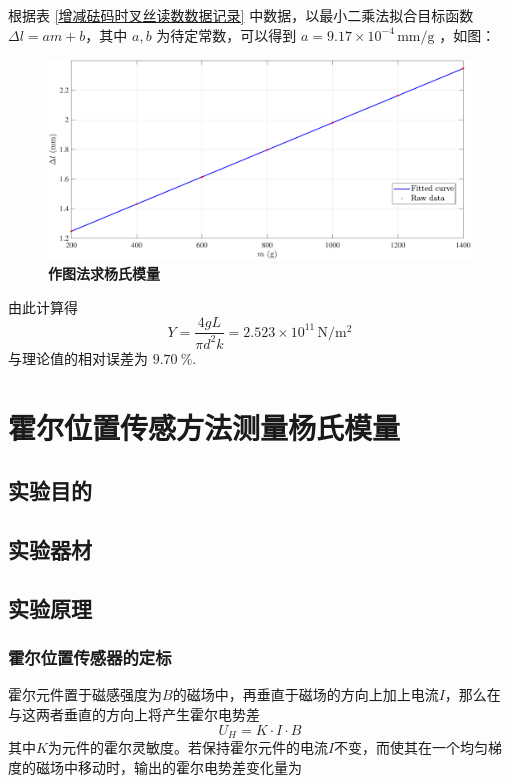 \documentclass[zihao=5, UTF8]{article}
\theoremstyle{MyLineTheoremStyle} %
\theoremstyle{MyBlockTheoremStyle} %
\theoremstyle{MySubsubsectionStyle} %
\begin{document}
根据表 \ref{增减砝码时叉丝读数数据记录} 中数据，以最小二乘法拟合目标函数 $\Delta l = am+b $，其中 $a,b$ 为待定常数，可以得到 $a= 9.17\times10^{-4}\,\mathrm{mm/g}$ ，如图：

\begin{figure}[H]
    \centering
    \includegraphics[width=\textwidth]{assets/2024-08-23_19-54-13.pdf}
    \caption{\textbf{作图法求杨氏模量}}\label{作图法求杨氏模量}
\end{figure}

由此计算得
	\begin{equation}
        Y=\frac{4gL}{\pi d^2k}=2.523\times10^{11}\,\mathrm{N/m^2}
    \end{equation}
与理论值的相对误差为 $9.70\ \%$.

\newpage
\section{霍尔位置传感方法测量杨氏模量}

\subsection{实验目的}
\subsection{实验器材}
\subsection{实验原理}
\subsubsection{霍尔位置传感器的定标}

霍尔元件置于磁感强度为$ B $的磁场中，再垂直于磁场的方向上加上电流$ I $，那么在与这两者垂直的方向上将产生霍尔电势差
\begin{equation}
    U_H=K\cdot I\cdot B
\end{equation}
其中$ K $为元件的霍尔灵敏度。若保持霍尔元件的电流$ I $不变，而使其在一个均匀梯度的磁场中移动时，输出的霍尔电势差变化量为
\end{document}
